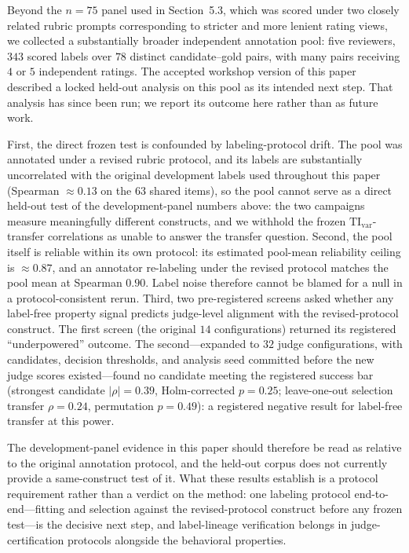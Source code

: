 \documentclass{article}
\begin{document}
Beyond the \(n=75\) panel used in Section~5.3, which was scored under two closely related rubric prompts corresponding to stricter and more lenient rating views, we collected a substantially broader independent annotation pool: five reviewers, \(343\) scored labels over \(78\) distinct candidate--gold pairs, with many pairs receiving \(4\) or \(5\) independent ratings. The accepted workshop version of this paper described a locked held-out analysis on this pool as its intended next step. That analysis has since been run; we report its outcome here rather than as future work.

First, the direct frozen test is confounded by labeling-protocol drift. The pool was annotated under a revised rubric protocol, and its labels are substantially uncorrelated with the original development labels used throughout this paper (Spearman \(\approx 0.13\) on the \(63\) shared items), so the pool cannot serve as a direct held-out test of the development-panel numbers above: the two campaigns measure meaningfully different constructs, and we withhold the frozen \(\mathrm{TI}_{\mathrm{var}}\)-transfer correlations as unable to answer the transfer question. Second, the pool itself is reliable within its own protocol: its estimated pool-mean reliability ceiling is \(\approx 0.87\), and an annotator re-labeling under the revised protocol matches the pool mean at Spearman \(0.90\). Label noise therefore cannot be blamed for a null in a protocol-consistent rerun. Third, two pre-registered screens asked whether any label-free property signal predicts judge-level alignment with the revised-protocol construct. The first screen (the original \(14\) configurations) returned its registered ``underpowered'' outcome. The second---expanded to \(32\) judge configurations, with candidates, decision thresholds, and analysis seed committed before the new judge scores existed---found no candidate meeting the registered success bar (strongest candidate \(|\rho|=0.39\), Holm-corrected \(p=0.25\); leave-one-out selection transfer \(\rho=0.24\), permutation \(p=0.49\)): a registered negative result for label-free transfer at this power.

The development-panel evidence in this paper should therefore be read as relative to the original annotation protocol, and the held-out corpus does not currently provide a same-construct test of it. What these results establish is a protocol requirement rather than a verdict on the method: one labeling protocol end-to-end---fitting and selection against the revised-protocol construct before any frozen test---is the decisive next step, and label-lineage verification belongs in judge-certification protocols alongside the behavioral properties.
\end{document}
